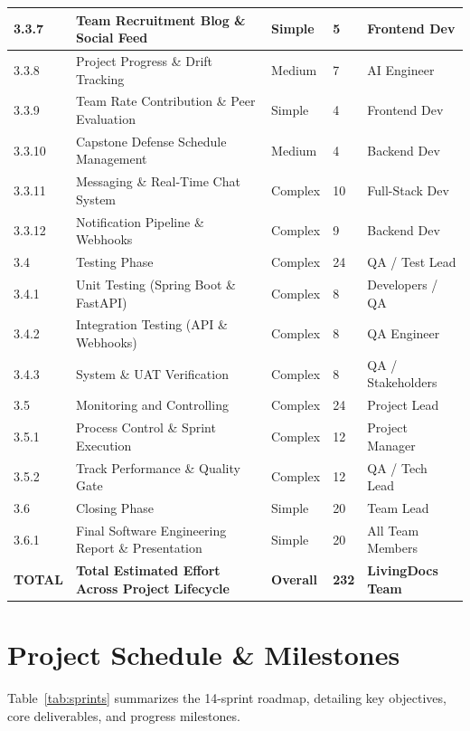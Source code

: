 \begin{footnotesize}
\begin{longtable}{|p{1.1cm}|p{4cm}|p{1.6cm}|p{1.4cm}|p{2.6cm}|}
\hline
3.3.7 & Team Recruitment Blog \& Social Feed & Simple & 5 & Frontend Dev \\
\hline
3.3.8 & Project Progress \& Drift Tracking & Medium & 7 & AI Engineer \\
\hline
3.3.9 & Team Rate Contribution \& Peer Evaluation & Simple & 4 & Frontend Dev \\
\hline
3.3.10 & Capstone Defense Schedule Management & Medium & 4 & Backend Dev \\
\hline
3.3.11 & Messaging \& Real-Time Chat System & Complex & 10 & Full-Stack Dev \\
\hline
3.3.12 & Notification Pipeline \& Webhooks & Complex & 9 & Backend Dev \\
\hline
3.4 & Testing Phase & Complex & 24 & QA / Test Lead \\
\hline
3.4.1 & Unit Testing (Spring Boot \& FastAPI) & Complex & 8 & Developers / QA \\
\hline
3.4.2 & Integration Testing (API \& Webhooks) & Complex & 8 & QA Engineer \\
\hline
3.4.3 & System \& UAT Verification & Complex & 8 & QA / Stakeholders \\
\hline
3.5 & Monitoring and Controlling & Complex & 24 & Project Lead \\
\hline
3.5.1 & Process Control \& Sprint Execution & Complex & 12 & Project Manager \\
\hline
3.5.2 & Track Performance \& Quality Gate & Complex & 12 & QA / Tech Lead \\
\hline
3.6 & Closing Phase & Simple & 20 & Team Lead \\
\hline
3.6.1 & Final Software Engineering Report \& Presentation & Simple & 20 & All Team Members \\
\hline
\hline
\textbf{TOTAL} & \textbf{Total Estimated Effort Across Project Lifecycle} & \textbf{Overall} & \textbf{232} & \textbf{LivingDocs Team} \\
\hline
\hline
\end{longtable}
\end{footnotesize}

\section{Project Schedule \& Milestones}

Table~\ref{tab:sprints} summarizes the 14-sprint roadmap, detailing key objectives,
core deliverables, and progress milestones.


